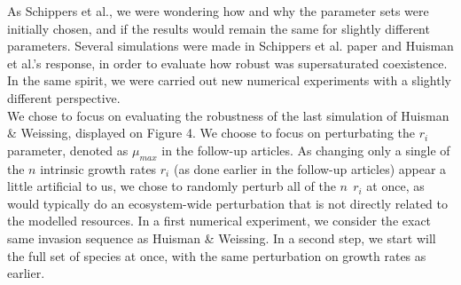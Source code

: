 As Schippers et al.\supercite{2008:Schippers}, we were wondering how and why the parameter sets were initially chosen, 
and if the results would remain the same for slightly different parameters. Several simulations were made in 
Schippers et al. paper\supercite{2008:Schippers} and Huisman et al.'s response\supercite{2008:Huisman}, in order to evaluate how robust was supersaturated 
coexistence. In the same spirit, we were carried out new numerical experiments with a slightly different perspective.\\

We chose to focus on evaluating the robustness of the last simulation of Huisman \& Weissing\supercite{1999:Huisman}, displayed on Figure 4. We choose to focus on perturbating the 
$r_i$ parameter, denoted as $\mu_{max}$ in the follow-up articles\supercite{2008:Schippers,2008:Huisman}. 
As changing only a single of the $n$ intrinsic growth rates $r_i$ (as done earlier in the follow-up articles\supercite{2008:Schippers,2008:Huisman}) appear a little artificial to us, 
we chose to randomly perturb all of the $n~~r_i$ at once, as would typically do an ecosystem-wide perturbation that is not directly related to the modelled resources. 
In a first numerical experiment, we consider the exact same invasion sequence as Huisman \& Weissing\supercite{1999:Huisman}. 
In a second step, we start will the full set of species at once, with the same perturbation on growth rates as earlier. 

